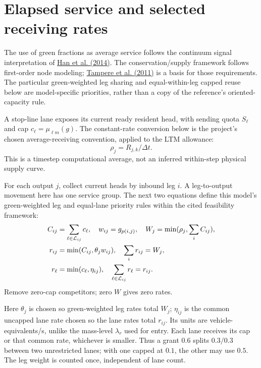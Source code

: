\documentclass[10pt,a4paper]{article}
\begin{document}
\section{Elapsed service and selected receiving rates}


The use of green fractions as average service follows the continuum
signal interpretation of
\href{https://arxiv.org/abs/1309.3461}{Han et al. (2014)}.
The conservation/supply framework follows first-order node modeling;
\href{https://doi.org/10.1016/j.trb.2010.06.004}{Tampere et al. (2011)}
is a basis for those requirements. The particular green-weighted leg
sharing and equal-within-leg capped reuse below are model-specific
priorities, rather than a copy of the reference's oriented-capacity rule.
\par

A stop-line lane exposes its current ready resident head, with sending
quota $S_\ell$ and cap $c_\ell=\mu_{\ell m}(g)$.
The constant-rate conversion below is the project's chosen average-receiving convention, applied to the LTM allowance:
\begin{equation}
 \rho_j=R_{j,k}/\Delta t .
 \label{eq:receiving-rate}
\end{equation}
This is a timestep computational average, not an inferred within-step
physical supply curve.

For each output $j$, collect current heads by inbound leg $i$.
A leg-to-output movement here has one service group.
The next two equations define this model's green-weighted leg and equal-lane priority rules within the cited feasibility framework:
\begin{align}
 C_{ij}&=\sum_{\ell\in{\cal L}_{ij}}c_\ell,\quad
 w_{ij}=g_{p(i,j)},\quad W_j=\min(\rho_j,\sum_iC_{ij}),\nonumber\\
 r_{ij}&=\min(C_{ij},\theta_jw_{ij}),\quad
                    \sum_i r_{ij}=W_j,\label{eq:leg-sharing}\\
 r_\ell&=\min(c_\ell,\eta_{ij}),\quad
                    \sum_{\ell\in{\cal L}_{ij}}r_\ell=r_{ij}.
 \label{eq:lane-sharing}
\end{align}
Remove zero-cap competitors; zero $W$ gives zero rates.

Here $\theta_j$ is chosen so green-weighted leg rates total $W_j$;
$\eta_{ij}$ is the common uncapped lane rate chosen so the lane rates
total $r_{ij}$. Its units are vehicle-equivalents/s, unlike the mass-level
$\lambda_r$ used for entry. Each lane receives its cap or that common
rate, whichever is smaller. Thus a grant $0.6$ splits $0.3/0.3$ between
two unrestricted lanes; with one capped at $0.1$, the other may use $0.5$.
The leg weight is counted once, independent of lane count.
\par
\end{document}
